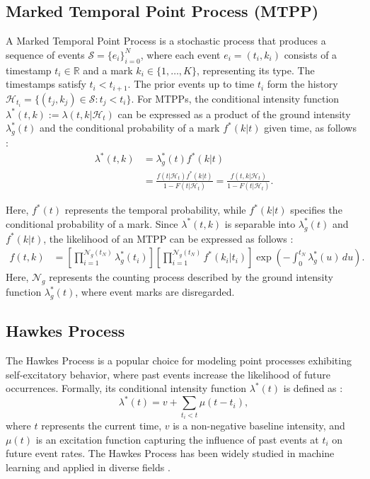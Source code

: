 \subsection{Marked Temporal Point Process (MTPP)}
A Marked Temporal Point Process is a stochastic process that produces a sequence of events $\mathcal{S} = \{e_i\}_{i=0}^N$, where each event $e_i = (t_i, k_i)$ consists of a timestamp $t_i \in \mathbb{R}$ and a mark $k_i \in \{1, \ldots, K\}$, representing its type. The timestamps satisfy $t_i < t_{i+1}$. The prior events up to time $t_i$ form the history $\mathcal{H}_{t_i} = \{(t_j, k_j) \in \mathcal{S} : t_j < t_i\}$. 
For MTPPs, the conditional intensity function $\lambda^*(t, k) := \lambda(t, k | \mathcal{H}_{t})$ can be expressed as a product of the ground intensity $\lambda_g^*(t)$ and the conditional probability of a mark $f^*(k|t)$ given time, as follows \cite{lec:tpp, lec:tpp_Rodriguez, bib:daley}:
\begin{equation}
\begin{aligned}
    \lambda^*(t, k) &= \lambda_g^*(t) f^*(k|t) \\
    &= \frac{f(t | \mathcal{H}_{t}) f^*(k|t)}{1 - F(t | \mathcal{H}_{t})} 
    = \frac{f(t, k | \mathcal{H}_{t})}{1 - F(t | \mathcal{H}_{t})}.
\end{aligned}
\end{equation}

Here, $f^*(t)$ represents the temporal probability, while $f^*(k|t)$ specifies the conditional probability of a mark. Since $\lambda^*(t,k)$ is separable into $\lambda_g^*(t)$ and $f^*(k|t)$, the likelihood of an MTPP can be expressed as follows \cite{bib:daley}:
\begin{align}
f(t, k) 
&= \left[\prod_{i=1}^{\mathcal{N}_g(t_N)} \lambda_g^*(t_i)\right] \left[\prod_{i=1}^{\mathcal{N}_g(t_N)} f^*(k_i | t_i)\right] \exp\left(-\int_0^{t_N} \lambda_g^*(u) \, du\right).
\label{eq:likelihood}
\end{align}
Here, $\mathcal{N}_g$ represents the counting process described by the ground intensity function $\lambda_g^*(t)$, where event marks are disregarded.

\subsection{Hawkes Process}
The Hawkes Process \label{bg: hp} is a popular choice for modeling point processes exhibiting self-excitatory behavior, where past events increase the likelihood of future occurrences. Formally, its conditional intensity function $\lambda^*(t)$ is defined as \cite{bib:hawkes}:
\begin{equation}
\lambda^*(t) = v + \sum_{t_i < t} \mu(t - t_i),
\end{equation}
where $t$ represents the current time, $v$ is a non-negative baseline intensity, and $\mu(t)$ is an excitation function capturing the influence of past events at $t_i$ on future event rates. The Hawkes Process has been widely studied in machine learning \cite{bib:ANHP, bib:nhp, bib:THP, bib:sahp} and applied in diverse fields \cite{hawkesInFinance, bib:onlineInteraction, bib:hawkesDocuments}.

